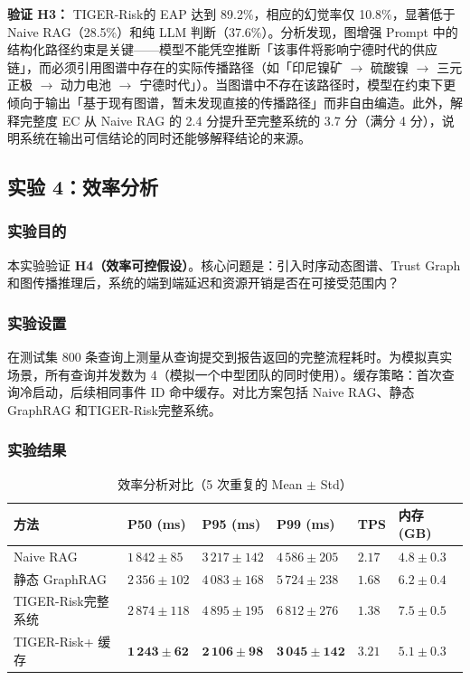\documentclass[12pt,a4paper]{article}
\newcommand{\projectshort}{TIGER-Risk}
\begin{document}
\textbf{验证 H3：} \projectshort 的 EAP 达到 89.2\%，相应的幻觉率仅 10.8\%，显著低于 Naive RAG（28.5\%）和纯 LLM 判断（37.6\%）。分析发现，图增强 Prompt 中的结构化路径约束是关键——模型不能凭空推断「该事件将影响宁德时代的供应链」，而必须引用图谱中存在的实际传播路径（如「印尼镍矿 $\to$ 硫酸镍 $\to$ 三元正极 $\to$ 动力电池 $\to$ 宁德时代」）。当图谱中不存在该路径时，模型在约束下更倾向于输出「基于现有图谱，暂未发现直接的传播路径」而非自由编造。此外，解释完整度 EC 从 Naive RAG 的 2.4 分提升至完整系统的 3.7 分（满分 4 分），说明系统在输出可信结论的同时还能够解释结论的来源。

\subsection{实验 4：效率分析}
\label{sec:exp-efficiency}

\subsubsection{实验目的}

本实验验证 \textbf{H4（效率可控假设）}。核心问题是：引入时序动态图谱、Trust Graph 和图传播推理后，系统的端到端延迟和资源开销是否在可接受范围内？

\subsubsection{实验设置}

在测试集 800 条查询上测量从查询提交到报告返回的完整流程耗时。为模拟真实场景，所有查询并发数为 4（模拟一个中型团队的同时使用）。缓存策略：首次查询冷启动，后续相同事件 ID 命中缓存。对比方案包括 Naive RAG、静态 GraphRAG 和\projectshort 完整系统。

\subsubsection{实验结果}

\begin{table}[H]
\centering
\footnotesize
\caption{效率分析对比（5 次重复的 Mean $\pm$ Std）}
\label{tab:exp-efficiency}
\begin{tabularx}{0.95\linewidth}{>{\raggedright\arraybackslash}p{2.6cm} >{\centering\arraybackslash}X >{\centering\arraybackslash}X >{\centering\arraybackslash}X >{\centering\arraybackslash}X >{\centering\arraybackslash}X}
\toprule
\textbf{方法} & \textbf{P50 (ms)} & \textbf{P95 (ms)} & \textbf{P99 (ms)} & \textbf{TPS} & \textbf{内存 (GB)} \\
\midrule
Naive RAG & $1\,842 \pm 85$ & $3\,217 \pm 142$ & $4\,586 \pm 205$ & $2.17$ & $4.8 \pm 0.3$ \\
静态 GraphRAG & $2\,356 \pm 102$ & $4\,083 \pm 168$ & $5\,724 \pm 238$ & $1.68$ & $6.2 \pm 0.4$ \\
\projectshort 完整系统 & $2\,874 \pm 118$ & $4\,895 \pm 195$ & $6\,812 \pm 276$ & $1.38$ & $7.5 \pm 0.5$ \\
\projectshort + 缓存 & $\mathbf{1\,243 \pm 62}$ & $\mathbf{2\,106 \pm 98}$ & $\mathbf{3\,045 \pm 142}$ & $\mathbf{3.21}$ & $\mathbf{5.1 \pm 0.3}$ \\
\bottomrule
\end{tabularx}
\end{table}
\end{document}
